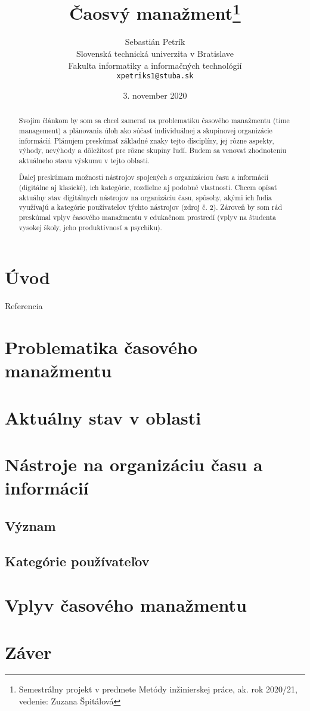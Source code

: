 \documentclass[11pt,slovak,a4paper]{article}
\title{Čaosvý manažment\thanks{Semestrálny projekt v predmete Metódy inžinierskej práce, ak. rok 2020/21, vedenie: Zuzana Špitálová}}
\author{Sebastián Petrík\\[2pt]
	{\small Slovenská technická univerzita v Bratislave}\\
	{\small Fakulta informatiky a informačných technológií}\\
	{\small \texttt{xpetriks1@stuba.sk}}
	}
\date{\small 3. november 2020}
\begin{document}
\maketitle

\begin{abstract}
Svojím článkom by som sa chcel zamerať na problematiku časového manažmentu (time management) a plánovania úloh ako súčasť individuálnej a skupinovej organizácie informácií. Plánujem preskúmať základné znaky tejto disciplíny, jej rôzne aspekty, výhody, nevýhody a dôležitosť pre rôzne skupiny ľudí. Budem sa venovať zhodnoteniu aktuálneho stavu výskumu v tejto oblasti.

Ďalej preskúmam možnosti nástrojov spojených s organizáciou času a informácií (digitálne aj klasické), ich kategórie, rozdielne aj podobné vlastnosti. Chcem opísať aktuálny stav digitálnych nástrojov na organizáciu času, spôsoby, akými ich ľudia využívajú a kategórie používateľov týchto nástrojov (zdroj č. 2). Zároveň by som rád preskúmal vplyv časového manažmentu v edukačnom prostredí (vplyv na študenta vysokej školy, jeho produktívnosť a psychiku).

\end{abstract}
\newpage

\section{Úvod}
	Referencia\cite{Franssila}
\section{Problematika časového manažmentu}

\section{Aktuálny stav v oblasti}
	

\section{Nástroje na organizáciu času a informácií}
	\subsection{Význam}
	\subsection{Kategórie používateľov}

\section{Vplyv časového manažmentu}
\section{Záver}



\end{document}
